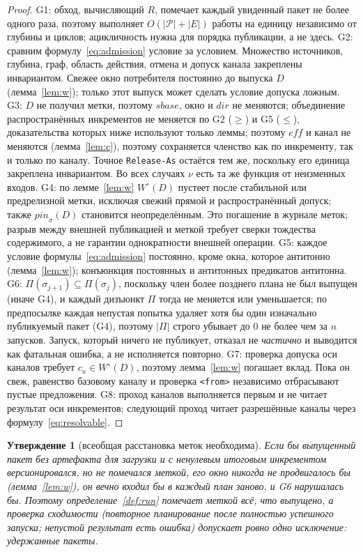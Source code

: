 \documentclass[sigconf,nonacm]{acmart}
\theoremstyle{acmplain}
\newtheorem{proposition}[theorem]{Утверждение}
\theoremstyle{acmdefinition}
\theoremstyle{acmplain}
\newcommand{\code}[1]{\texttt{#1}}
\newcommand{\G}[1]{G#1}
\begin{document}
\begin{proof}
\G{1}: обход, вычисляющий $R$, помечает каждый увиденный пакет не более
одного раза, поэтому выполняет $O(|\mathcal{P}|{+}|E|)$ работы на единицу независимо от
глубины и циклов; ацикличность нужна для порядка публикации, а не здесь.
\G{2}: сравним формулу~\ref{eq:admission} условие за условием. Множество
источников, глубина, граф, область действия, отмена и допуск канала закреплены
инвариантом. Свежее окно потребителя постоянно до выпуска $D$
(лемма~\ref{lem:w}); только этот выпуск может сделать условие допуска ложным.
\G{3}: $D$ не получил метки, поэтому $\mathit{sbase}$, окно и
$\mathit{dir}$ не меняются; объединение распространённых инкрементов не меняется по \G{2}
($\geq$) и \G{5} ($\leq$), доказательства которых ниже используют только леммы; поэтому
$\mathit{eff}$ и канал не меняются (лемма~\ref{lem:c}), поэтому сохраняется
членство как по инкременту, так и только по каналу. Точное \code{Release-As}
остаётся тем же, поскольку его единица закреплена инвариантом. Во всех случаях
$\nu$ есть та же функция от неизменных входов.
\G{4}: по лемме~\ref{lem:w} $W^\circ(D)$ пустеет после стабильной или
предрелизной метки, исключая свежий прямой и распространённый допуск; также
$\mathit{pin}_\sigma(D)$ становится неопределённым. Это
погашение в журнале меток; разрыв между внешней публикацией и меткой требует
сверки тождества содержимого, а не гарантии однократности внешней операции.
\G{5}: каждое условие формулы~\ref{eq:admission} постоянно, кроме
окна, которое антитонно (лемма~\ref{lem:w}); конъюнкция
постоянных и антитонных предикатов антитонна.
\G{6}: $\Pi(\sigma_{j+1}) \subseteq \Pi(\sigma_j)$, поскольку член
более позднего плана не был выпущен (иначе \G{4}), и каждый дизъюнкт
$\Pi$ тогда не меняется или уменьшается; по предпосылке каждая непустая
попытка удаляет хотя бы один изначально публикуемый пакет (\G{4}), поэтому
$|\Pi|$ строго убывает до $0$ не более чем за
$n$ запусков. Запуск, который ничего не публикует, отказал не \emph{частично}
и выводится как фатальная ошибка, а не исполняется повторно.
\G{7}: проверка допуска оси каналов требует $c_u\in W^\circ(D)$, поэтому
лемма~\ref{lem:w} погашает вклад. Пока он свеж, равенство базовому каналу и
проверка \code{<from>} независимо отбрасывают пустые предложения.
\G{8}: проход каналов выполняется первым и не читает результат оси
инкрементов; следующий проход читает разрешённые каналы через
формулу~\ref{eq:resolvable}.
\end{proof}

\begin{proposition}[всеобщая расстановка меток необходима]
\label{prop:tagall}
Если бы выпущенный пакет без артефакта для загрузки и с ненулевым итоговым
инкрементом версионировался, но не помечался меткой, его окно никогда не
продвигалось бы (лемма~\ref{lem:w}), он вечно входил бы в каждый план заново,
и \G{6} нарушалась бы. Поэтому
определение~\ref{def:run} помечает меткой всё, что выпущено, а
проверка сходимости (повторное планирование после полностью успешного запуска; непустой
результат есть ошибка) допускает ровно одно исключение: удержанные пакеты.
\end{proposition}
\end{document}
